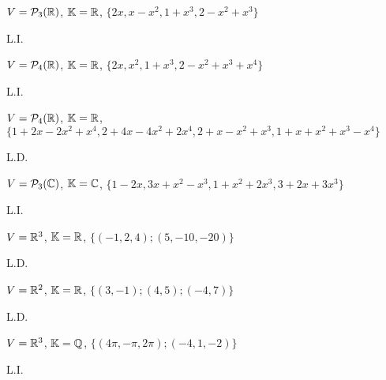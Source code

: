 \documentclass[12pt]{exam}
\begin{document}
    \begin{exercicio}
        $V = \mathcal{P}_3(\mathbb{R})$, $\mathbb{K} = \mathbb{R}$, $\{2x, x - x^2, 1 + x^3, 2 - x^2 + x^3\}$
        \begin{solucao}
            L.I.
        \end{solucao}
    \end{exercicio}

    \begin{exercicio}
        $V = \mathcal{P}_4(\mathbb{R})$, $\mathbb{K} = \mathbb{R}$, $\{2x, x^2, 1 + x^3, 2 - x^2 + x^3 + x^4\}$
        \begin{solucao}
            L.I.
        \end{solucao}
    \end{exercicio}

    \begin{exercicio}
        $V = \mathcal{P}_4(\mathbb{R})$, $\mathbb{K} = \mathbb{R}$, $\{1 + 2x - 2x^2 + x^4, 2 + 4x - 4x^2 + 2x^4, 2 + x - x^2 + x^3, 1 + x + x^2 + x^3 - x^4\}$
        \begin{solucao}
            L.D.
        \end{solucao}
    \end{exercicio}
 
    \begin{exercicio}
        $V = \mathcal{P}_3(\mathbb{C})$, $\mathbb{K} = \mathbb{C}$, $\{1 - 2x, 3x + x^2 - x^3, 1 + x^2 + 2x^3, 3 + 2x + 3x^3\}$
        \begin{solucao}
            L.I.
        \end{solucao}
    \end{exercicio}

    \begin{exercicio}
        $V = \mathbb{R}^3$, $\mathbb{K} = \mathbb{R}$, $\{(-1, 2, 4); (5, -10, -20)\}$
        \begin{solucao}
            L.D.
        \end{solucao}
    \end{exercicio}
    
    \begin{exercicio}
        $V = \mathbb{R}^2$, $\mathbb{K} = \mathbb{R}$, $\{(3, -1); (4, 5); (-4, 7)\}$
        \begin{solucao}
            L.D.
        \end{solucao}
    \end{exercicio}

    \begin{exercicio}
        $V = \mathbb{R}^3$, $\mathbb{K} = \mathbb{Q}$, $\{(4\pi, -\pi, 2\pi); (-4, 1, -2)\}$
        \begin{solucao}
            L.I.
        \end{solucao}
    \end{exercicio}
\end{document}
